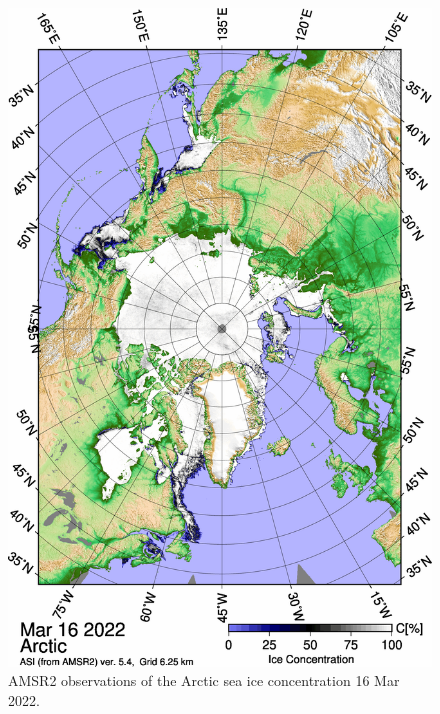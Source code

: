 \documentclass[../main/thesis.tex]{subfiles}
\begin{document}
\begin{figure}
    \centering
    \includegraphics[width=.8\textwidth]{amsr216.png}
    \caption{\label{fig:S-amsr2-16}AMSR2 observations of the Arctic sea ice concentration 16 Mar 2022.}
\end{figure}
\end{document}
